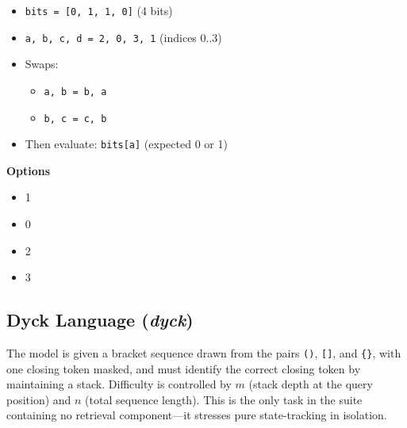 \documentclass[11pt]{article}
\theoremstyle{definition}
\begin{document}
\begin{tcolorbox}[colback=gray!5!white, colframe=gray!75!black, title=Example Prompt, breakable]
\small
\begin{itemize}
\item \texttt{bits = [0, 1, 1, 0]} \quad (4 bits)
\item \texttt{a, b, c, d = 2, 0, 3, 1} \quad (indices 0..3)
\item Swaps:
\begin{itemize}
\item \texttt{a, b = b, a}
\item \texttt{b, c = c, b}
\end{itemize}
\item Then evaluate: \texttt{bits[a]} (expected 0 or 1)
\end{itemize}

\textbf{Options}
\begin{itemize}
\item[A)] 1
\item[B)] 0
\item[C)] 2
\item[D)] 3
\end{itemize}
\end{tcolorbox}

\subsection{Dyck Language (\textit{dyck})}

The model is given a bracket sequence drawn from the pairs \texttt{()}, \texttt{[]}, and \texttt{\{\}}, with one closing token masked, and must identify the correct closing token by maintaining a stack. Difficulty is controlled by $m$ (stack depth at the query position) and $n$ (total sequence length). This is the only task in the suite containing no retrieval component---it stresses pure state-tracking in isolation.
\end{document}
